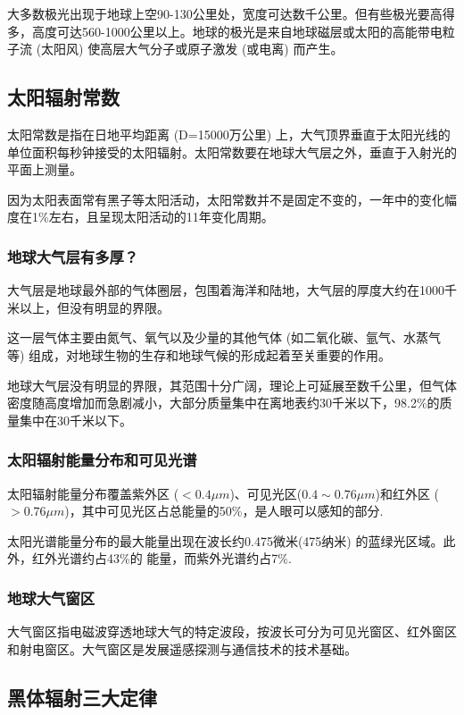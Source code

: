 \documentclass[12pt,a4paper]{article}
\begin{document}
	大多数极光出现于地球上空90-130公里处，宽度可达数千公里。但有些极光要高得多，高度可达560-1000公里以上。地球的极光是来自地球磁层或太阳的高能带电粒子流 (太阳风) 使高层大气分子或原子激发 (或电离) 而产生。
	
	\subsection{太阳辐射常数}
	太阳常数是指在日地平均距离 (D=15000万公里) 上，大气顶界垂直于太阳光线的单位面积每秒钟接受的太阳辐射。太阳常数要在地球大气层之外，垂直于入射光的平面上测量。
	
	因为太阳表面常有黑子等太阳活动，太阳常数并不是固定不变的，一年中的变化幅度在1\%左右，且呈现太阳活动的11年变化周期。
	
	\subsubsection{地球大气层有多厚？}
	
	大气层是地球最外部的气体圈层，包围着海洋和陆地，大气层的厚度大约在1000千米以上，但没有明显的界限。
	
	这一层气体主要由氮气、氧气以及少量的其他气体 (如二氧化碳、氩气、水蒸气等) 组成，对地球生物的生存和地球气候的形成起着至关重要的作用。
	
	地球大气层没有明显的界限，其范围十分广阔，理论上可延展至数千公里，但气体密度随高度增加而急剧减小，大部分质量集中在离地表约30千米以下，98.2\%的质量集中在30千米以下。
	
	\subsubsection{太阳辐射能量分布和可见光谱}
	
	太阳辐射能量分布覆盖紫外区 ($<0.4 \mu m$)、可见光区($0.4 \sim 0.76 \mu m$)和红外区 ($>0.76 \mu m$)，其中可见光区占总能量的50\%，是人眼可以感知的部分.
	
	太阳光谱能量分布的最大能量出现在波长约0.475微米(475纳米) 的蓝绿光区域。此外，红外光谱约占43\%的
	能量，而紫外光谱约占7\%.
	
	\subsubsection{地球大气窗区}
	大气窗区指电磁波穿透地球大气的特定波段，按波长可分为可见光窗区、红外窗区和射电窗区。大气窗区是发展遥感探测与通信技术的技术基础。
	
	\subsection{黑体辐射三大定律}
	
\end{document}
